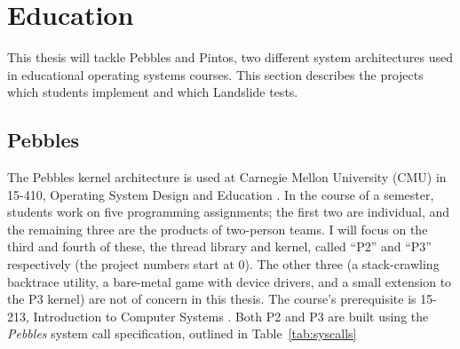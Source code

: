 
\section{Education}
\label{sec:overview-edu}

This thesis will tackle Pebbles and Pintos, two different system architectures used in educational operating systems courses.
This section describes the projects which students implement and which Landslide tests.

\subsection{Pebbles}
\label{sec:pebbles}

The Pebbles kernel architecture
is used at Carnegie Mellon University (CMU) in 15-410, Operating System Design and Education \cite{kspec,thrlib}.
In the course of a semester, students work on five programming assignments;
the first two are individual, and the remaining three are the products of two-person teams.
I will focus on the third and fourth of these, the thread library and kernel,
called ``P2'' and ``P3'' respectively (the project numbers start at 0).
The other three (a stack-crawling backtrace utility, a bare-metal game with device drivers, and a small extension to the P3 kernel) are not of concern in this thesis.
The course's prerequisite is 15-213, Introduction to Computer Systems \cite{sigcse01:CSaPP}.
Both P2 and P3 are built using the {\em Pebbles} system call specification, outlined in Table~\ref{tab:syscalls}

